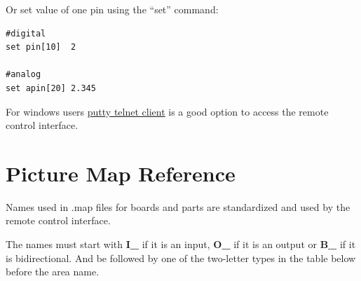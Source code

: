 Or set value of one pin using the ``set'' command:
\begin{verbatim}
#digital
set pin[10]  2

#analog
set apin[20] 2.345
\end{verbatim}



For windows users \href{https://www.putty.org/}{putty telnet client} is a good option 
to access the remote control interface. 


\section{Picture Map Reference}\hypertarget{def:map}{}

Names used in .map files for boards and parts are standardized and used by the remote control interface. 

The names must start with \textbf{I\_} if it is an input, \textbf{O\_} if it is an output or \textbf{B\_} if it
is bidirectional. 
And be followed by one of the two-letter types in the table below before the area name. 

